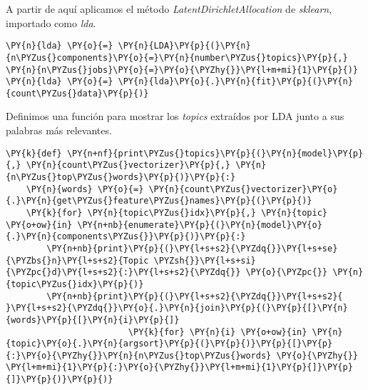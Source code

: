 A partir de aquí aplicamos el método \textit{LatentDirichletAllocation} de \textit{sklearn}, importado como \textit{lda}.

\vspace{0.5cm}
    \begin{tcolorbox}[breakable, size=fbox, boxrule=1pt, pad at break*=1mm,colback=cellbackground, colframe=cellborder]
\begin{Verbatim}[commandchars=\\\{\}]
\PY{n}{lda} \PY{o}{=} \PY{n}{LDA}\PY{p}{(}\PY{n}{n\PYZus{}components}\PY{o}{=}\PY{n}{number\PYZus{}topics}\PY{p}{,} \PY{n}{n\PYZus{}jobs}\PY{o}{=}\PY{o}{\PYZhy{}}\PY{l+m+mi}{1}\PY{p}{)}
\PY{n}{lda} \PY{o}{=} \PY{n}{lda}\PY{o}{.}\PY{n}{fit}\PY{p}{(}\PY{n}{count\PYZus{}data}\PY{p}{)}
\end{Verbatim}
\end{tcolorbox}




Definimos una función para mostrar los \textit{topics} extraídos por  LDA junto a sus palabras más relevantes.
\vspace{0.5cm}

    \begin{tcolorbox}[breakable, size=fbox, boxrule=1pt, pad at break*=1mm,colback=cellbackground, colframe=cellborder]
\begin{Verbatim}[commandchars=\\\{\}]
\PY{k}{def} \PY{n+nf}{print\PYZus{}topics}\PY{p}{(}\PY{n}{model}\PY{p}{,} \PY{n}{count\PYZus{}vectorizer}\PY{p}{,} \PY{n}{n\PYZus{}top\PYZus{}words}\PY{p}{)}\PY{p}{:}
    \PY{n}{words} \PY{o}{=} \PY{n}{count\PYZus{}vectorizer}\PY{o}{.}\PY{n}{get\PYZus{}feature\PYZus{}names}\PY{p}{(}\PY{p}{)}
    \PY{k}{for} \PY{n}{topic\PYZus{}idx}\PY{p}{,} \PY{n}{topic} \PY{o+ow}{in} \PY{n+nb}{enumerate}\PY{p}{(}\PY{n}{model}\PY{o}{.}\PY{n}{components\PYZus{}}\PY{p}{)}\PY{p}{:}
        \PY{n+nb}{print}\PY{p}{(}\PY{l+s+s2}{\PYZdq{}}\PY{l+s+se}{\PYZbs{}n}\PY{l+s+s2}{Topic \PYZsh{}}\PY{l+s+si}{\PYZpc{}d}\PY{l+s+s2}{:}\PY{l+s+s2}{\PYZdq{}} \PY{o}{\PYZpc{}} \PY{n}{topic\PYZus{}idx}\PY{p}{)}
        \PY{n+nb}{print}\PY{p}{(}\PY{l+s+s2}{\PYZdq{}}\PY{l+s+s2}{ }\PY{l+s+s2}{\PYZdq{}}\PY{o}{.}\PY{n}{join}\PY{p}{(}\PY{p}{[}\PY{n}{words}\PY{p}{[}\PY{n}{i}\PY{p}{]}
                        \PY{k}{for} \PY{n}{i} \PY{o+ow}{in} \PY{n}{topic}\PY{o}{.}\PY{n}{argsort}\PY{p}{(}\PY{p}{)}\PY{p}{[}\PY{p}{:}\PY{o}{\PYZhy{}}\PY{n}{n\PYZus{}top\PYZus{}words} \PY{o}{\PYZhy{}} \PY{l+m+mi}{1}\PY{p}{:}\PY{o}{\PYZhy{}}\PY{l+m+mi}{1}\PY{p}{]}\PY{p}{]}\PY{p}{)}\PY{p}{)}
\end{Verbatim}
\end{tcolorbox}

